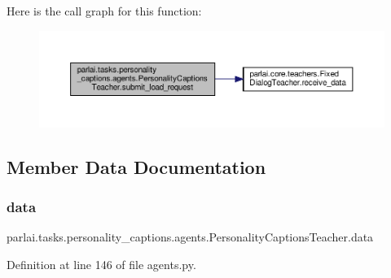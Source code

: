 Here is the call graph for this function\+:
\nopagebreak
\begin{figure}[H]
\begin{center}
\leavevmode
\includegraphics[width=350pt]{classparlai_1_1tasks_1_1personality__captions_1_1agents_1_1PersonalityCaptionsTeacher_a8b15a0281c0e15c0f4af16da820f7a52_cgraph}
\end{center}
\end{figure}


\subsection{Member Data Documentation}
\mbox{\label{classparlai_1_1tasks_1_1personality__captions_1_1agents_1_1PersonalityCaptionsTeacher_ab9c9ef3660e1304eeeaa067f06cf7ab1}} 
\subsubsection{\texorpdfstring{data}{data}}
{\footnotesize\ttfamily parlai.\+tasks.\+personality\+\_\+captions.\+agents.\+Personality\+Captions\+Teacher.\+data}



Definition at line 146 of file agents.\+py.



